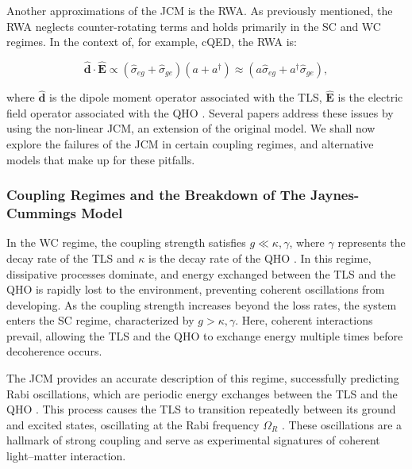 \documentclass[12pt,a4paper]{article}
\begin{document}
Another approximations of the JCM is the RWA. As previously mentioned, the RWA neglects counter-rotating terms and holds primarily in the SC and WC regimes. In the context of, for example, cQED, the RWA is:

\begin{equation}
    \boldsymbol{\hat{d}}\cdot\boldsymbol{\hat{E}} \propto (\hat{\sigma}_{eg} + \hat{\sigma}_{ge})(a + a^\dagger)\approx (a\hat{\sigma}_{eg} + a^\dagger\hat{\sigma}_{ge}), \label{RWA}
\end{equation}

where $\boldsymbol{\hat{d}}$ is the dipole moment operator associated with the TLS, $\boldsymbol{\hat{E}}$ is the electric field operator associated with the QHO \cite{General2024-JCM_relevance}. Several papers \cite{General2010_USC_failure, Context2024-CircuitQED} address these issues by using the non-linear JCM, an extension of the original model. 
We shall now explore the failures of the JCM in certain coupling regimes, and alternative models that make up for these pitfalls.

\subsubsection{Coupling Regimes and the Breakdown of The Jaynes-Cummings Model}


In the WC regime, the coupling strength satisfies $g \ll \kappa, \gamma$, where $\gamma$ represents the decay rate of the TLS and $\kappa$ is the decay rate of the QHO \cite{Context2017-USC_failure}. In this regime, dissipative processes dominate, and energy exchanged between the TLS and the QHO is rapidly lost to the environment, preventing coherent oscillations from developing. As the coupling strength increases beyond the loss rates, the system enters the SC regime, characterized by $g > \kappa, \gamma$. Here, coherent interactions prevail, allowing the TLS and the QHO to exchange energy multiple times before decoherence occurs.

The JCM provides an accurate description of this regime, successfully predicting Rabi oscillations, which are periodic energy exchanges between the TLS and the QHO \cite{Context1993-JC_Verification}. This process causes the TLS to transition repeatedly between its ground and excited states, oscillating at the Rabi frequency $\Omega_R$ \cite{Context_-Rabi_oscillations}. These oscillations are a hallmark of strong coupling and serve as experimental signatures of coherent light–matter interaction.
\end{document}
